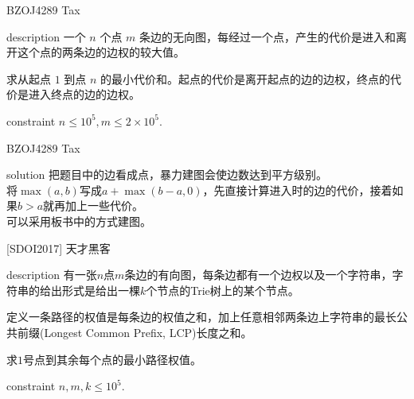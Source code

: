 \documentclass{beamer}
\def\le{\leqslant}
\begin{document}
\begin{frame}{BZOJ4289 Tax}
	\begin{block}{description}
		一个 $n$ 个点 $m$ 条边的无向图，每经过一个点，产生的代价是进入和离开这个点的两条边的边权的较大值。
		
		求从起点 $1$ 到点 $n$ 的最小代价和。起点的代价是离开起点的边的边权，终点的代价是进入终点的边的边权。
	\end{block}
	\begin{block}{constraint}
		$n \le 10^5, m \le 2 \times 10^5.$
	\end{block}
\end{frame}
\begin{frame}{BZOJ4289 Tax}
	\begin{block}{solution}
		把题目中的边看成点，暴力建图会使边数达到平方级别。\\
		
		将$\max(a,b)$写成$a+\max(b-a,0)$，先直接计算进入时的边的代价，接着如果$b>a$就再加上一些代价。\\
		
		可以采用板书中的方式建图。
	\end{block}
\end{frame}
\begin{frame}{[SDOI2017] 天才黑客}
	\begin{block}{description}
		有一张$n$点$m$条边的有向图，每条边都有一个边权以及一个字符串，字符串的给出形式是给出一棵$k$个节点的Trie树上的某个节点。
		
		定义一条路径的权值是每条边的权值之和，加上任意相邻两条边上字符串的最长公共前缀(Longest Common Prefix, LCP)长度之和。
		
		求$1$号点到其余每个点的最小路径权值。
	\end{block}
	\begin{block}{constraint}
		$n, m, k \le 10^5.$
	\end{block}
\end{frame}
\end{document}
